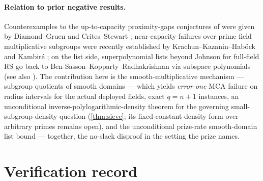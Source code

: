 \documentclass[11pt]{article}
\theoremstyle{definition}
\begin{document}
\paragraph{Relation to prior negative results.}  Counterexamples to the up-to-capacity proximity-gaps conjectures of \cite{BCIKS23} were given by Diamond--Gruen and Crites--Stewart \cite{DG25,CS25}; near-capacity failures over prime-field multiplicative subgroups were recently established by Krachun--Kazanin--Hab\"ock and Kambir\'e \cite{KKH26,Kambire26}; on the list side, superpolynomial lists beyond Johnson for full-field RS go back to Ben-Sasson--Kopparty--Radhakrishnan via subspace polynomials \cite{BKR10} (see also \cite{GR06}).  The contribution here is the smooth-multiplicative mechanism --- subgroup quotients of smooth domains --- which yields \emph{error-one} MCA failure on radius intervals for the actual deployed fields, exact $q=n+1$ instances, an unconditional inverse-polylogarithmic-density theorem for the governing small-subgroup density question (\cref{thm:sieve}; its fixed-constant-density form over arbitrary primes remains open), and the unconditional prize-rate smooth-domain list bound --- together, the no-slack disproof in the setting the prize names.

\appendix

\section{Verification record}\label{app:verify}
\end{document}
